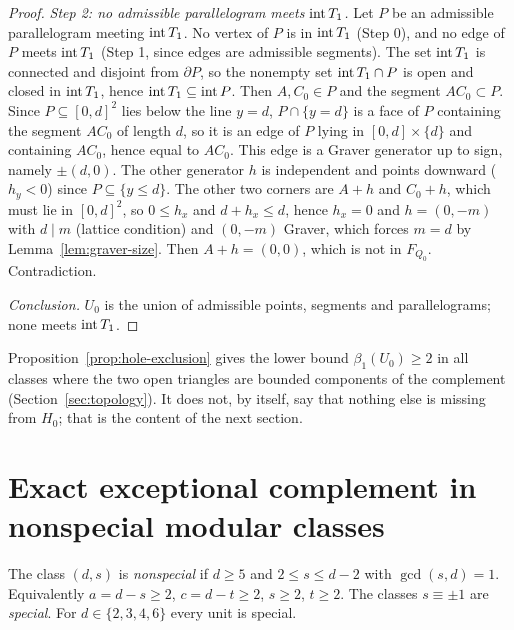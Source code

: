 \begin{proof}
\emph{Step 2: no admissible parallelogram meets $\operatorname{int} T_1$.} Let $P$ be an admissible parallelogram meeting $\operatorname{int} T_1$. No vertex of $P$ is in $\operatorname{int} T_1$ (Step 0), and no edge of $P$ meets $\operatorname{int} T_1$ (Step 1, since edges are admissible segments). The set $\operatorname{int} T_1$ is connected and disjoint from $\partial P$, so the nonempty set $\operatorname{int} T_1\cap P$ is open and closed in $\operatorname{int} T_1$, hence $\operatorname{int} T_1\subseteq\operatorname{int} P$. Then $A,C_0\in P$ and the segment $AC_0\subset P$. Since $P\subseteq[0,d]^2$ lies below the line $y=d$, $P\cap\{y=d\}$ is a face of $P$ containing the segment $AC_0$ of length $d$, so it is an edge of $P$ lying in $[0,d]\times\{d\}$ and containing $AC_0$, hence equal to $AC_0$. This edge is a Graver generator up to sign, namely $\pm(d,0)$. The other generator $h$ is independent and points downward ($h_y<0$) since $P\subseteq\{y\le d\}$. The other two corners are $A+h$ and $C_0+h$, which must lie in $[0,d]^2$, so $0\le h_x$ and $d+h_x\le d$, hence $h_x=0$ and $h=(0,-m)$ with $d\mid m$ (lattice condition) and $(0,-m)$ Graver, which forces $m=d$ by Lemma~\ref{lem:graver-size}. Then $A+h=(0,0)$, which is not in $F_{Q_0}$. Contradiction.

\emph{Conclusion.} $U_0$ is the union of admissible points, segments and parallelograms; none meets $\operatorname{int} T_1$.
\end{proof}

\begin{remark}\label{rem:holes-lowerbound}
Proposition~\ref{prop:hole-exclusion} gives the lower bound $\beta_1(U_0)\ge 2$ in all classes where the two open triangles are bounded components of the complement (Section~\ref{sec:topology}). It does not, by itself, say that nothing else is missing from $H_0$; that is the content of the next section.
\end{remark}

\section{Exact exceptional complement in nonspecial modular classes}\label{sec:nonspecial}

\begin{definition}
The class $(d,s)$ is \emph{nonspecial} if $d\ge5$ and $2\le s\le d-2$ with $\gcd(s,d)=1$. Equivalently $a=d-s\ge2$, $c=d-t\ge2$, $s\ge2$, $t\ge2$. The classes $s\equiv\pm1$ are \emph{special}. For $d\in\{2,3,4,6\}$ every unit is special.
\end{definition}


